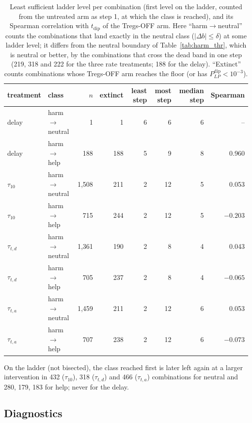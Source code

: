 \documentclass[11pt]{article}
\begin{document}
\begin{table}[H]
\centering
\caption{Least sufficient ladder level per combination (first level on the
ladder, counted from the untreated arm as step 1, at which the class is
reached), and its Spearman correlation with $t_{\mathrm{dip}}$ of the Tregs-OFF
arm. Here ``harm$\to$neutral'' counts the combinations that land exactly in the
neutral class ($|\Delta b| \le \delta$) at some ladder level; it differs from the
neutral boundary of Table~\ref{tab:harm_thr}, which is neutral or better, by the
combinations that cross the dead band in one step (219, 318 and 222 for the three
rate treatments; 188 for the delay). ``Extinct'' counts combinations whose Tregs-OFF arm
reaches the floor (or has $P_{LP}^{\mathrm{dip}}<10^{-3}$).}
\label{tab:harm_dose}
\begin{tabular}{llrrrrrr}
\toprule
treatment & class & $n$ & extinct & least step & most step & median step & Spearman \\
\midrule
delay & harm$\to$neutral & 1 & 1 & 6 & 6 & 6 & -- \\
delay & harm$\to$help & 188 & 188 & 5 & 9 & 8 & 0.960 \\
$\tau_{10}$ & harm$\to$neutral & 1{,}508 & 211 & 2 & 12 & 5 & 0.053 \\
$\tau_{10}$ & harm$\to$help & 715 & 244 & 2 & 12 & 5 & $-0.203$ \\
$\tau_{t,d}$ & harm$\to$neutral & 1{,}361 & 190 & 2 & 8 & 4 & 0.043 \\
$\tau_{t,d}$ & harm$\to$help & 705 & 237 & 2 & 8 & 4 & $-0.065$ \\
$\tau_{t,a}$ & harm$\to$neutral & 1{,}459 & 211 & 2 & 12 & 6 & 0.053 \\
$\tau_{t,a}$ & harm$\to$help & 707 & 238 & 2 & 12 & 6 & $-0.073$ \\
\bottomrule
\end{tabular}
\end{table}
On the ladder (not bisected), the class reached first is later left again at a
larger intervention in 432 ($\tau_{10}$), 318 ($\tau_{t,d}$) and 466
($\tau_{t,a}$) combinations for neutral and 280, 179, 183 for help; never for the
delay.

\subsection{Diagnostics}
\end{document}
